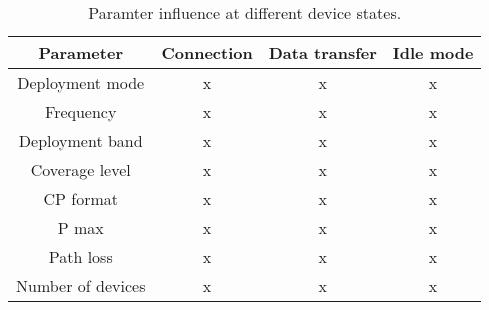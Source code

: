 


\begin{table}[H]
\centering
\begin{tabular}{|c|c|c|c|}\hline
Parameter		& Connection	& Data transfer	& Idle mode \\ \hline
Deployment mode & x				& x				& x			\\ \hline
Frequency		& x				& x				& x			\\ \hline
Deployment band & x				& x				& x			\\ \hline
Coverage level	& x				& x				& x			\\ \hline
CP format		& x				& x				& x			\\ \hline
P max			& x				& x				& x			\\ \hline
Path loss		& x				& x				& x			\\ \hline
Number of devices & x			& x				& x			\\ \hline
\end{tabular}
\caption{Paramter influence at different device states.}
\label{tab:parameter_vs_device_state}
\end{table}